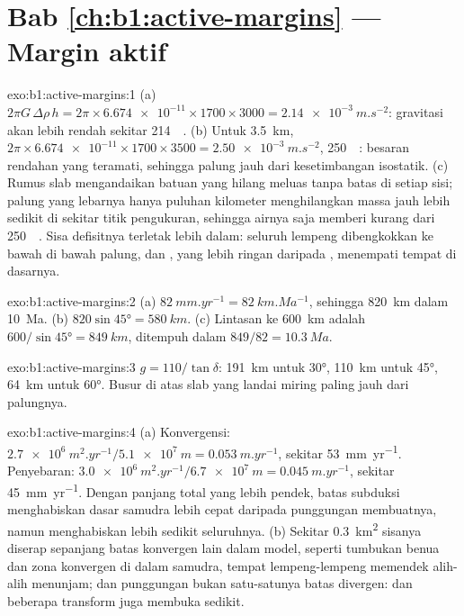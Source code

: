 \section*{Bab \ref{ch:b1:active-margins} --- Margin aktif}

\begin{solution}{exo:b1:active-margins:1}
(a) $2\pi G\,\Delta\rho\,h = 2\pi\times\num{6.674e-11}\times1700\times3000 =
\qty{2.14e-3}{m.s^{-2}}$: gravitasi akan lebih rendah sekitar
\qty{214}{\milli\gal}. (b) Untuk \qty{3.5}{km},
$2\pi\times\num{6.674e-11}\times1700\times3500 = \qty{2.50e-3}{m.s^{-2}}$,
\qty{250}{\milli\gal}: besaran rendahan yang teramati, sehingga palung jauh dari
kesetimbangan isostatik. (c) Rumus slab mengandaikan batuan yang hilang meluas tanpa
batas di setiap sisi; palung yang lebarnya hanya puluhan kilometer menghilangkan massa
jauh lebih sedikit di sekitar titik pengukuran, sehingga airnya saja memberi kurang dari
\qty{250}{\milli\gal}. Sisa defisitnya terletak lebih dalam: seluruh lempeng dibengkokkan
ke bawah di bawah palung, dan , yang lebih ringan daripada , menempati
tempat  di dasarnya.
\end{solution}

\begin{solution}{exo:b1:active-margins:2}
(a) $\qty{82}{mm.yr^{-1}} = \qty{82}{km.Ma^{-1}}$, sehingga \qty{820}{km} dalam
\qty{10}{Ma}. (b) $820\sin\ang{45} = \qty{580}{km}$. (c) Lintasan ke
\qty{600}{km} adalah $600/\sin\ang{45} = \qty{849}{km}$, ditempuh dalam
$849/82 = \qty{10.3}{Ma}$.
\end{solution}

\begin{solution}{exo:b1:active-margins:3}
$g = 110/\tan\delta$: \qty{191}{km} untuk \ang{30}, \qty{110}{km} untuk \ang{45},
\qty{64}{km} untuk \ang{60}. Busur di atas slab yang landai miring paling jauh dari
palungnya.
\end{solution}

\begin{solution}{exo:b1:active-margins:4}
(a) Konvergensi: $\qty{2.7e6}{m^2.yr^{-1}}/\qty{5.1e7}{m} =
\qty{0.053}{m.yr^{-1}}$, sekitar \qty{53}{mm.yr^{-1}}. Penyebaran:
$\qty{3.0e6}{m^2.yr^{-1}}/\qty{6.7e7}{m} = \qty{0.045}{m.yr^{-1}}$, sekitar
\qty{45}{mm.yr^{-1}}. Dengan panjang total yang lebih pendek, batas subduksi
menghabiskan dasar samudra lebih cepat daripada punggungan membuatnya, namun
menghabiskan lebih sedikit seluruhnya. (b) Sekitar \qty{0.3}{km^2} sisanya diserap
sepanjang batas konvergen lain dalam model, seperti tumbukan benua dan zona konvergen
di dalam samudra, tempat lempeng-lempeng memendek alih-alih menunjam; dan punggungan
bukan satu-satunya batas divergen:  dan beberapa transform juga membuka
sedikit.
\end{solution}

